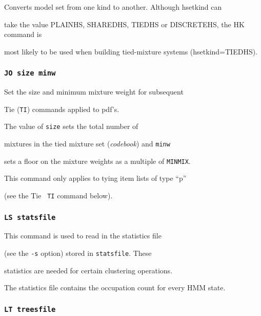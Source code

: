 Converts model set from one kind to another.  Although hsetkind can


take the value PLAINHS, SHAREDHS, TIEDHS or DISCRETEHS, the HK command is


most likely to be used when building tied-mixture systems (hsetkind=TIEDHS).





\subsubsection*{\tt JO size minw}





Set the size and minimum mixture weight for subsequent


Tie (\texttt{TI}) commands applied to pdf's.  


The value of \texttt{size} sets the total number of


mixtures in the tied mixture set ({\it codebook}) and \texttt{minw}


sets a floor on the mixture weights as a multiple of \texttt{MINMIX}.


This command only applies to tying item lists of type ``p''


(see the Tie \texttt{ TI} command below).





\subsubsection*{\tt LS statsfile}





This command is used to read in the  statistics file 


(see the  \texttt{-s} option) stored in \texttt{statsfile}.  These


statistics are needed for certain clustering operations.


The statistics file contains the occupation count for every HMM state. 





\subsubsection*{\tt LT treesfile}






